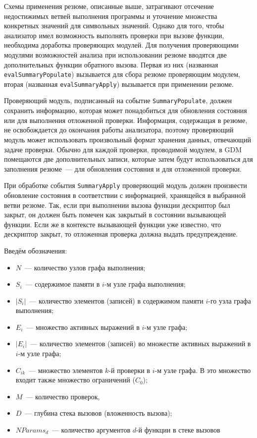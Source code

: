 Схемы применения резюме, описанные выше, затрагивают отсечение недостижимых ветвей выполнения программы и уточнение множества конкретных значений для символьных значений. Однако для того, чтобы анализатор имел возможность выполнять проверки при вызове функции, необходима доработка проверяющих модулей. Для получения проверяющими модулями возможностей анализа при использовании резюме вводятся две дополнительных функции обратного вызова. Первая из них (названная \texttt{evalSummaryPopulate}) вызывается для сбора резюме проверяющим модулем, вторая (названная \texttt{evalSummaryApply}) вызывается при применении резюме.

Проверяющий модуль, подписанный на событие \texttt{SummaryPopulate}, должен сохранить информацию, которая может понадобиться для обновления состояния или для выполнения отложенной проверки. Информация, содержащая в резюме, не освобождается до окончания работы анализатора, поэтому проверяющий модуль может использовать произвольный формат хранения данных, отвечающий задаче проверки. Обычно для каждой проверки, проводимой модулем, в GDM помещаются две дополнительных записи, которые затем будут использоваться для заполнения резюме~--- для обновления состояния и для отложенной проверки.

При обработке события \texttt{SummaryApply} проверяющий модуль должен произвести обновление состояния в соответствии с информацией, хранящейся в выбранной ветви резюме. Так, если при выполнении вызова функции дескриптор был закрыт, он должен быть помечен как закрытый в состоянии вызывающей функции. Если же в контексте вызывающей функции уже известно, что дескриптор закрыт, то отложенная проверка должна выдать предупреждение.

 Введём обозначения:

\begin {itemize}
 \item $N$~--- количество узлов графа выполнения;
 \item $S_i$~--- содержимое памяти в $i$-м узле графа выполнения;
 \item $|S_i|$~--- количество элементов (записей) в содержимом памяти $i$-го узла графа выполнения;
 \item $E_i$~--- множество активных выражений в $i$-м узле графа;
 \item $|E_i|$~--- количество элементов (записей) во множестве активных выражений в $i$-м узле графа;
 \item $C_{ik}$~--- множество элементов $k$-й проверки в $i$-м узле графа. В это множество входит также множество ограничений ($C_0$);
 \item $M$~--- количество проверок,
 \item $D$~--- глубина стека вызовов (вложенность вызова);
 \item $NParams_d$~--- количество аргументов $d$-й функции в стеке вызовов
\end {itemize}

